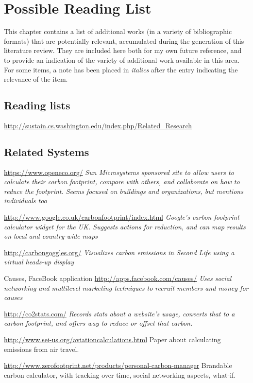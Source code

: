\chapter{Possible Reading List}
This chapter contains a list of additional works (in a variety of bibliographic formats) that are potentially relevant, accumulated during the generation of this literature review. They are included here both for my own future reference, and to provide an indication of the variety of additional work available in this area. For some items, a note has been placed in \emph{italics} after the entry indicating the relevance of the item.

\section{Reading lists}

\url{http://sustain.cs.washington.edu/index.php/Related_Research}


\section{Related Systems}

\url{https://www.openeco.org/} \emph{Sun Microsystems sponsored site to allow users to calculate their carbon footprint, compare with others, and collaborate on how to reduce the footprint. Seems focused on buildings and organizations, but mentions individuals too}

\url{http://www.google.co.uk/carbonfootprint/index.html} \emph{Google's carbon footprint calculator widget for the UK. Suggests actions for reduction, and can map results on local and country-wide maps}

\url{http://carbongoggles.org/} \emph{Visualizes carbon emissions in Second Life using a virtual heads-up display}

Causes, FaceBook application \url{http://apps.facebook.com/causes/} \emph{Uses social networking and multilevel marketing techniques to recruit members and money for causes}

\url{http://co2stats.com/} \emph{Records stats about a website's usage, converts that to a carbon footprint, and offers way to reduce or offset that carbon.}

\url{http://www.sei-us.org/aviationcalculations.html} Paper about calculating \COtwo emissions from air travel.

\url{http://www.zerofootprint.net/products/personal-carbon-manager} Brandable carbon calculator, with tracking over time, social networking aspects, what-if.



